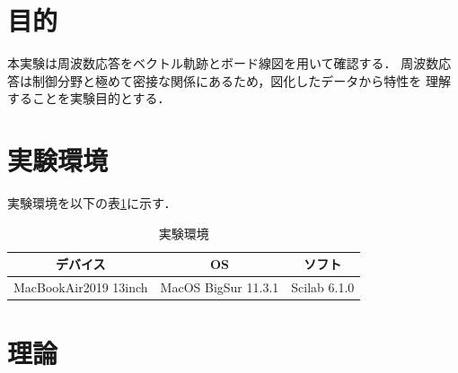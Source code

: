 \documentclass[a4paper,11pt]{jsarticle}
\begin{document}
\section{目的}
  本実験は周波数応答をベクトル軌跡とボード線図を用いて確認する．
  周波数応答は制御分野と極めて密接な関係にあるため，図化したデータから特性を
  理解することを実験目的とする．

\section{実験環境}
  実験環境を以下の表\ref{em}に示す．
  \begin{table}[H]
    \begin{center}
      \caption{実験環境}
      \begin{tabular}{|c|c|c|}  \hline 
        デバイス &  OS & ソフト \\ \hline 
        MacBookAir2019 13inch &  MacOS BigSur 11.3.1 & Scilab 6.1.0 \\ \hline
      \end{tabular}
      \label{em}
    \end{center}
  \end{table}

\section{理論}
\end{document}
